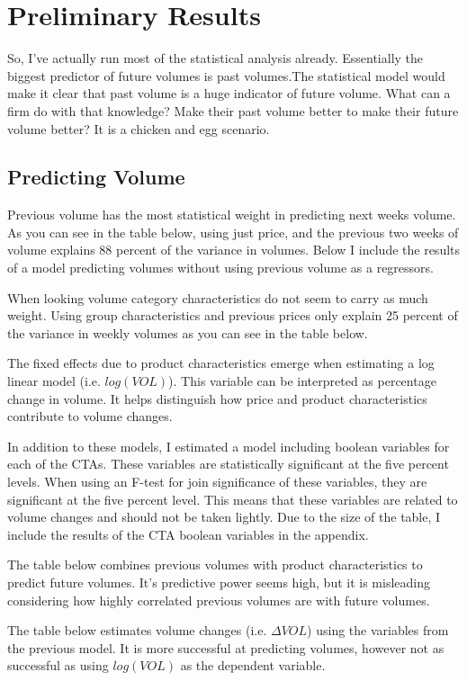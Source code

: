 \documentclass{article}
\begin{document}
\section{Preliminary Results}

So, I've actually run most of the statistical analysis already. Essentially the biggest predictor of future volumes is past volumes.The statistical model would make it clear that past volume is a huge indicator of future volume. What can a firm do with that knowledge? Make their past volume better to make their future volume better? It is a chicken and egg scenario.

\subsection{Predicting Volume}

Previous volume has the most statistical weight in predicting next weeks volume. As you can see in the table below, using just price, and the previous two weeks of volume explains 88 percent of the variance in volumes. Below I include the results of a model predicting volumes without using previous volume as a regressors.


When looking volume category characteristics do not seem to carry as much weight. Using group characteristics and previous prices only explain 25 percent of the variance in weekly volumes as you can see in the table below.

The fixed effects due to product characteristics emerge when estimating a log linear model (i.e. $log(VOL)$).  This variable can be interpreted as percentage change in volume. It helps distinguish how price and product characteristics contribute to volume changes. 


In addition to these models, I estimated a model including boolean variables for each of the CTAs. These variables are statistically significant at the five percent levels. When using an F-test for join significance of these variables, they are significant at the five percent level. This means that these variables are related to volume changes and should not be taken lightly. Due to the size of the table, I include the results of the CTA boolean variables in the appendix.

The table below combines previous volumes with product characteristics to predict future volumes. It's predictive power seems high, but it is misleading considering how highly correlated previous volumes are with future volumes.

The table below estimates volume changes (i.e. $\Delta VOL$) using the variables from the previous model. It is more successful at predicting volumes, however not as successful as using $log(VOL)$ as the dependent variable.
\end{document}
